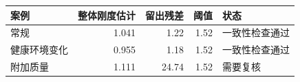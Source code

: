 \begin{tabular}{lrrrl}\toprule
案例 & 整体刚度估计 & 留出残差 & 阈值 & 状态\\\midrule
常规 & 1.041 & 1.22 & 1.52 & 一致性检查通过 \\
健康环境变化 & 0.955 & 1.18 & 1.52 & 一致性检查通过 \\
附加质量 & 1.111 & 24.74 & 1.52 & 需要复核 \\
\bottomrule\end{tabular}
